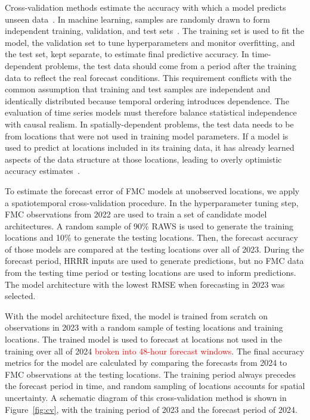 \documentclass[fire,article,submit,pdftex,moreauthors]{Definitions/mdpi}
\begin{document}
Cross-validation methods estimate the accuracy with which a model predicts unseen data~\citep[Sect.~7.10]{Hastie-2010-ESL}. In machine learning, samples are randomly drawn to form independent training, validation, and test sets~\citep[Sect.~7.2]{Hastie-2010-ESL}. The training set is used to fit the model, the validation set to tune hyperparameters and monitor overfitting, and the test set, kept separate, to estimate final predictive accuracy. In time-dependent problems, the test data should come from a period after the training data to reflect the real forecast conditions. This requirement conflicts with the common assumption that training and test samples are independent and identically distributed because temporal ordering introduces dependence. The evaluation of time series models must therefore balance statistical independence with causal realism. In spatially-dependent problems, the test data needs to be from locations that were not used in training model parameters. If a model is used to predict at locations included in its training data, it has already learned aspects of the data structure at those locations, leading to overly optimistic accuracy estimates~\citep{Schreck-2023-MLV}.

To estimate the forecast error of FMC models at unobserved locations, we apply a spatiotemporal cross-validation procedure. In the hyperparameter tuning step, FMC observations from 2022 are used to train a set of candidate model architectures. A random sample of 90\% RAWS is used to generate the training locations and 10\% to generate the testing locations. Then, the forecast accuracy of those models are compared at the testing locations over all of 2023. During the forecast period, HRRR inputs are used to generate predictions, but no FMC data from the testing time period or testing locations are used to inform predictions. The model architecture with the lowest RMSE when forecasting in 2023 was selected. 

With the model architecture fixed, the model is trained from scratch on observations in 2023 with a random sample of testing locations and training locations. The trained model is used to forecast at locations not used in the training over all of 2024 \textcolor{red}{broken into 48-hour forecast windows}. The final accuracy metrics for the model are calculated by comparing the forecasts from 2024 to FMC observations at the testing locations. The training period always precedes the forecast period in time, and random sampling of locations accounts for spatial uncertainty. A schematic diagram of this cross-validation method is shown in Figure~\ref{fig:cv}, with the training period of 2023 and the forecast period of 2024.
\end{document}
